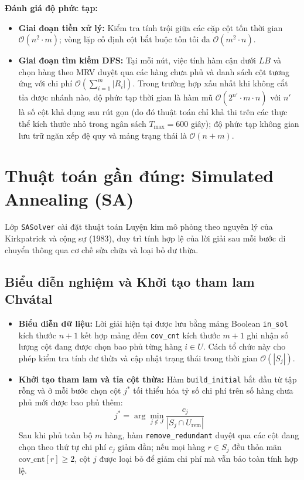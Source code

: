 \documentclass[11pt, a4paper]{article}
\begin{document}
\textbf{Đánh giá độ phức tạp:}
\begin{itemize}
    \item \textbf{Giai đoạn tiền xử lý:} Kiểm tra tính trội giữa các cặp cột tốn thời gian $\mathcal{O}(n^2 \cdot m)$; vòng lặp cố định cột bắt buộc tốn tối đa $\mathcal{O}(m^2 \cdot n)$.
    \item \textbf{Giai đoạn tìm kiếm DFS:} Tại mỗi nút, việc tính hàm cận dưới $LB$ và chọn hàng theo MRV duyệt qua các hàng chưa phủ và danh sách cột tương ứng với chi phí $\mathcal{O}(\sum_{i=1}^m |R_i|)$. Trong trường hợp xấu nhất khi không cắt tỉa được nhánh nào, độ phức tạp thời gian là hàm mũ $\mathcal{O}(2^{n'} \cdot m \cdot n)$ với $n'$ là số cột khả dụng sau rút gọn (do đó thuật toán chỉ khả thi trên các thực thể kích thước nhỏ trong ngân sách $T_{\max} = 600$ giây); độ phức tạp không gian lưu trữ ngăn xếp đệ quy và mảng trạng thái là $\mathcal{O}(n + m)$.
\end{itemize}

\section{Thuật toán gần đúng: Simulated Annealing (SA)}

Lớp \texttt{SASolver} cài đặt thuật toán Luyện kim mô phỏng theo nguyên lý của Kirkpatrick và cộng sự (1983), duy trì tính hợp lệ của lời giải sau mỗi bước di chuyển thông qua cơ chế sửa chữa và loại bỏ dư thừa.

\subsection{Biểu diễn nghiệm và Khởi tạo tham lam Chvátal}
\begin{itemize}
    \item \textbf{Biểu diễn dữ liệu:} Lời giải hiện tại được lưu bằng mảng Boolean \texttt{in\_sol} kích thước $n + 1$ kết hợp mảng đếm \texttt{cov\_cnt} kích thước $m + 1$ ghi nhận số lượng cột đang được chọn bao phủ từng hàng $i \in U$. Cách tổ chức này cho phép kiểm tra tính dư thừa và cập nhật trạng thái trong thời gian $\mathcal{O}(|S_j|)$.
    \item \textbf{Khởi tạo tham lam và tỉa cột thừa:} Hàm \texttt{build\_initial} bắt đầu từ tập rỗng và ở mỗi bước chọn cột $j^*$ tối thiểu hóa tỷ số chi phí trên số hàng chưa phủ mới được bao phủ thêm:
    \[
    j^* = \arg\min_{j \notin J} \frac{c_j}{|S_j \cap U_{\text{rem}}|}
    \]
    Sau khi phủ toàn bộ $m$ hàng, hàm \texttt{remove\_redundant} duyệt qua các cột đang chọn theo thứ tự chi phí $c_j$ giảm dần; nếu mọi hàng $r \in S_j$ đều thỏa mãn $\text{cov\_cnt}[r] \ge 2$, cột $j$ được loại bỏ để giảm chi phí mà vẫn bảo toàn tính hợp lệ.
\end{itemize}
\end{document}

